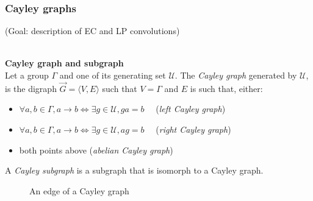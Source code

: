 \documentclass[t,9pt,pdftex]{beamer}
\theoremstyle{definition}
\newcommand{\cu}{\mathcal{U}}
\newcommand{\gve}{G = \langle V, E \rangle}
\newcommand{\vgve}{\vec{G} = \langle V, E \rangle}
\newcommand{\h}[1]{\hspace{#1pt}}
\begin{document}
\begin{frame}[c, label=current]
  \frametitle{Cayley graphs}
  (Goal: description of EC and LP convolutions)\\\h{0}\\
  \begin{definition}\textbf{Cayley graph and subgraph}\\
  Let a group $\Gamma$ and one of its generating set $\cu$. The \emph{Cayley graph} generated by $\cu$, is the digraph $\vgve$ such that $V = \Gamma$ and $E$ is such that, either:
  \begin{itemize}
  \item $\forall a,b \in \Gamma, a \rightarrow b \Leftrightarrow \exists g \in \cu, ga = b \quad$ (\emph{left Cayley graph})
  \item $\forall a,b \in \Gamma, a \rightarrow b \Leftrightarrow \exists g \in \cu, ag = b \quad$ (\emph{right Cayley graph})
  \item both points above (\emph{abelian Cayley graph})
  \end{itemize}
  A \emph{Cayley subgraph} is a subgraph that is isomorph to a Cayley graph.
  \end{definition}

  \begin{figure}
  \begin{center}
  \end{center}
  \caption{An edge of a Cayley graph}
  \end{figure}

\end{frame}
\end{document}
